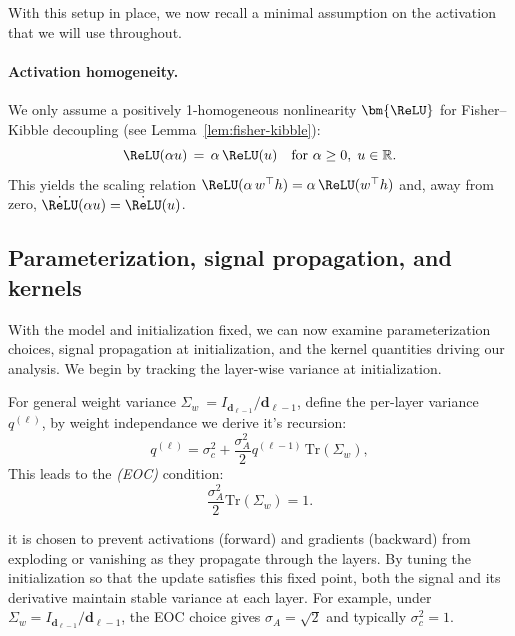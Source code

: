 With this setup in place, we now recall a minimal assumption on the activation that we will use throughout.

\paragraph{Activation homogeneity.}\label{assump:homogeneous_activation}
We only assume a positively 1-homogeneous nonlinearity \(\bm{\ReLU}\) for Fisher–Kibble decoupling (see Lemma~\ref{lem:fisher-kibble}):
\[
\ReLU(\alpha u) \,=\, \alpha\,\ReLU(u) \quad \text{for } \alpha \ge 0,\; u \in \mathbb{R}.
\]
This yields the scaling relation \(\ReLU(\alpha\, w^\top h) = \alpha\,\ReLU(w^\top h)\) and, away from zero, \(\dot{\ReLU}(\alpha u)=\dot{\ReLU}(u)\).

\subsection{Parameterization, signal propagation, and kernels}

With the model and initialization fixed, we can now examine parameterization choices, signal propagation at initialization, and the kernel quantities driving our analysis. We begin by tracking the layer-wise variance at initialization.

For general weight variance \(\Sigma_w\ = I_{\bm{d}_{\ell-1}}/\bm{d}_{\ell-1}\), define the per-layer variance \( q^{(\ell)} \), by weight independance we derive it's recursion:
\[
q^{(\ell)} = \sigma_c^2 + \frac{\sigma_A^2}{2} q^{(\ell-1)}\,\mathrm{Tr}(\Sigma_w), \]
This leads to the \emph{(EOC)} condition: 
\[ \frac{\sigma_A^2}{2}\mathrm{Tr}(\Sigma_w)=1. \]

it is chosen to prevent activations (forward) and gradients (backward) from exploding or vanishing as they propagate through the layers. By tuning the initialization so that the update satisfies this fixed point, both the signal and its derivative maintain stable variance at each layer. For example, under \(\Sigma_w = I_{\bm{d}_{\ell-1}}/\bm{d}_{\ell-1}\), the EOC choice gives \(\sigma_A = \sqrt{2}\) and typically \(\sigma_c^2 = 1\).


